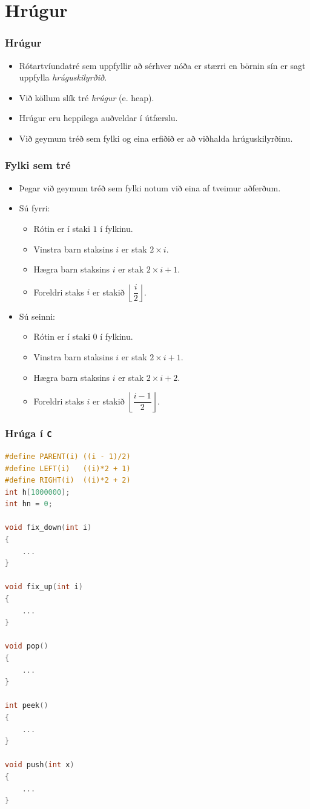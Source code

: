\documentclass[handout]{beamer}
\begin{document}
\section[Hrúgur]{Hrúgur}

\begin{frame}
\frametitle{Hrúgur}
\begin{itemize}
	\item<1-> Rótartvíundatré sem uppfyllir að sérhver nóða er stærri en börnin sín er sagt uppfylla \emph{hrúguskilyrðið}.
	\item<2-> Við köllum slík tré \emph{hrúgur} (e. heap).
	\item<3-> Hrúgur eru heppilega auðveldar í útfærslu.
	\item<4-> Við geymum tréð sem fylki og eina erfiðið er að viðhalda hrúguskilyrðinu.
\end{itemize}
\end{frame}

\begin{frame}
\frametitle{Fylki sem tré}
\begin{itemize}
\item<1-> Þegar við geymum tréð sem fylki notum við eina af tveimur aðferðum.
\item<2-> Sú fyrri:
	\begin{itemize}
		\item<3-> Rótin er í staki $1$ í fylkinu.
		\item<4-> Vinstra barn staksins $i$ er stak $2\times i$.
		\item<5-> Hægra barn staksins $i$ er stak $2\times i + 1$.
		\item<6-> Foreldri staks $i$ er stakið $\left \lfloor \dfrac{i}{2} \right \rfloor$.
	\end{itemize}
\item<7-> Sú seinni:
	\begin{itemize}
		\item<8-> Rótin er í staki $0$ í fylkinu.
		\item<9-> Vinstra barn staksins $i$ er stak $2\times i + 1$.
		\item<10-> Hægra barn staksins $i$ er stak $2\times i + 2$.
		\item<11-> Foreldri staks $i$ er stakið $\left \lfloor \dfrac{i - 1}{2} \right \rfloor$.
	\end{itemize}
\end{itemize}
\end{frame}

\begin{frame}[fragile]
	\frametitle{Hrúga í \texttt{C}}
	\tiny
	\begin{lstlisting}[language=C]
#define PARENT(i) ((i - 1)/2)
#define LEFT(i)   ((i)*2 + 1)
#define RIGHT(i)  ((i)*2 + 2)
int h[1000000];
int hn = 0;

void fix_down(int i)
{
	...
}

void fix_up(int i)
{
	...
}

void pop()
{
	...
}

int peek()
{
	...
}

void push(int x)
{
	...
}
\end{lstlisting}
\end{frame}
\end{document}
